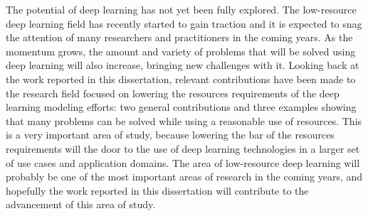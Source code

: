 The potential of deep learning has not yet been fully explored. The low-resource deep learning field has recently started to gain traction and it is expected to snag the attention of many researchers and practitioners in the coming years. As the momentum grows, the amount and variety of problems that will be solved using deep learning will also increase, bringing new challenges with it. Looking back at the work reported in this dissertation, relevant contributions have been made to the research field focused on lowering the resources requirements of the deep learning modeling efforts: two general contributions and three examples showing that many problems can be solved while using a reasonable use of resources. This is a very important area of study, because lowering the bar of the resources requirements will the door to the use of deep learning technologies in a larger set of use cases and application domains.  The area of low-resource deep learning will probably be one of the most important areas of research in the coming years, and hopefully the work reported in this dissertation will contribute to the advancement of this area of study.

